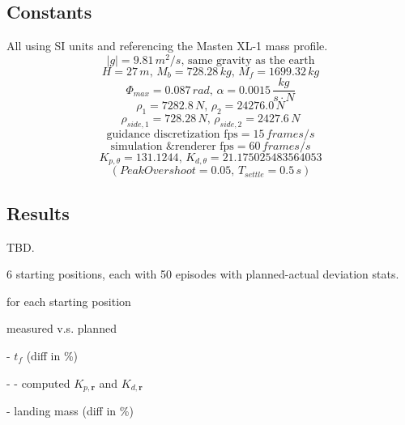 \documentclass[notitlepage,twocolumn,10pt]{article}
\begin{document}
\subsection{Constants} \label{sec:const}

All using SI units and referencing the Masten XL-1 mass profile.
\begin{equation*}
|g| = 9.81 \, m^2/s, \, \text{same gravity as the earth}
\end{equation*}
\begin{equation*}
H = 27 \, m, \, M_b = 728.28 \, kg, \, M_f = 1699.32 \, kg
\end{equation*}
\begin{equation*} 
\Phi_{max} = 0.087 \, rad, \, \alpha = 0.0015 \, \frac{kg}{s \cdot N}
\end{equation*}
\begin{equation*} 
\rho_1 = 7282.8 \, N, \, \rho_2 = 24276.0 \, N
\end{equation*}
\begin{equation*} 
\rho_{side,1} = 728.28 \, N, \, \rho_{side,2} = 2427.6 \, N
\end{equation*}
\begin{equation*}
\text{guidance discretization fps} =  15 \, frames/s
\end{equation*}
\begin{equation*}
\text{simulation \& renderer fps} =  60 \, frames/s
\end{equation*}
\begin{equation*}
K_{p, \theta} = 131.1244, \, K_{d, \theta} = 21.175025483564053
\end{equation*}
\begin{equation*}
(PeakOvershoot = 0.05, \, T_{settle} = 0.5 \, s)
\end{equation*}

\subsection{Results}
TBD.

6 starting positions, each with 50 episodes with planned-actual deviation stats.

for each starting position

measured v.s. planned

- $t_f$ (diff in \%)
  
  - - computed $K_{p, \mathbf{r}}$ and $K_{d, \mathbf{r}}$

- landing mass (diff in \%)
\end{document}
